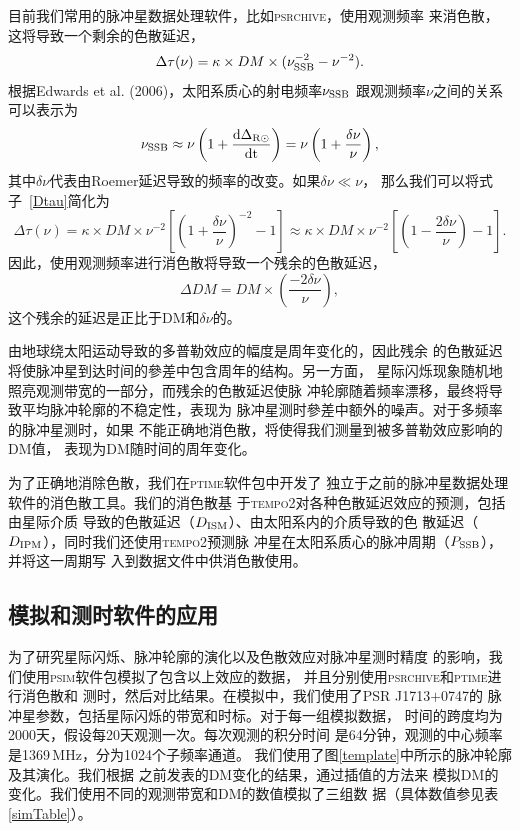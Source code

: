 目前我们常用的脉冲星数据处理软件，比如\textsc{psrchive}，使用观测频率
来消色散，这将导致一个剩余的色散延迟，
\begin{equation}
\Delta\tau(\nu)=\kappa\times DM\times(\nu_{\rm{SSB}}^{-2}-\nu^{-2}).
\label{Dtau}
\end{equation}
根据Edwards et al. (2006)\supercite{Edwards06}，太阳系质心的射电频率$\nu_{\rm{SSB}}$
跟观测频率$\nu$之间的关系可以表示为
\begin{equation}
\nu_{\rm{SSB}}\approx\nu\left(1+\frac{\rm{d}\Delta_{\rm{R\odot}}}{\rm{d}t}\right)=\nu\left(1+\frac{\delta\nu}{\nu}\right),
\end{equation}
%
其中$\delta\nu$代表由Roemer延迟导致的频率的改变。如果$\delta\nu\ll\nu$，
那么我们可以将式子~\ref{Dtau}简化为
%
\begin{equation}
\Delta\tau(\nu)=\kappa\times DM\times\nu^{-2}\left[\left(1+\frac{\delta\nu}{\nu}\right)^{-2}-1\right]\approx\kappa\times DM\times\nu^{-2}\left[\left(1-\frac{2\delta\nu}{\nu}\right)-1\right].
\end{equation}
%
因此，使用观测频率进行消色散将导致一个残余的色散延迟，
\begin{equation}
\Delta DM=DM\times\left(\frac{-2\delta\nu}{\nu}\right),
\label{dDM}
\end{equation}
这个残余的延迟是正比于DM和$\delta\nu$的。

由地球绕太阳运动导致的多普勒效应的幅度是周年变化的，因此残余
的色散延迟将使脉冲星到达时间的參差中包含周年的结构。另一方面，
星际闪烁现象随机地照亮观测带宽的一部分，而残余的色散延迟使脉
冲轮廓随着频率漂移，最终将导致平均脉冲轮廓的不稳定性，表现为
脉冲星测时參差中额外的噪声。对于多频率的脉冲星测时，如果
不能正确地消色散，将使得我们测量到被多普勒效应影响的DM值，
表现为DM随时间的周年变化。

为了正确地消除色散，我们在\textsc{ptime}软件包中开发了
独立于之前的脉冲星数据处理软件的消色散工具。我们的消色散基
于\textsc{tempo2}对各种色散延迟效应的预测，包括由星际介质
导致的色散延迟（$D_{\rm{ISM}}$）、由太阳系内的介质导致的色
散延迟（$D_{\rm{IPM}}$），同时我们还使用\textsc{tempo2}预测脉
冲星在太阳系质心的脉冲周期（$P_{\rm{SSB}}$），并将这一周期写
入到数据文件中供消色散使用。

\subsection{模拟和测时软件的应用}

为了研究星际闪烁、脉冲轮廓的演化以及色散效应对脉冲星测时精度
的影响，我们使用\textsc{psim}软件包模拟了包含以上效应的数据，
并且分别使用\textsc{psrchive}和\textsc{ptime}进行消色散和
测时，然后对比结果。在模拟中，我们使用了PSR J1713$+$0747的
脉冲星参数，包括星际闪烁的带宽和时标。对于每一组模拟数据，
时间的跨度均为2000天，假设每20天观测一次。每次观测的积分时间
是64分钟，观测的中心频率是1369\,MHz，分为1024个子频率通道。
我们使用了图\ref{template}中所示的脉冲轮廓及其演化。我们根据
之前发表的DM变化的结果\supercite{Keith13}，通过插值的方法来
模拟DM的变化。我们使用不同的观测带宽和DM的数值模拟了三组数
据（具体数值参见表\ref{simTable}）。

